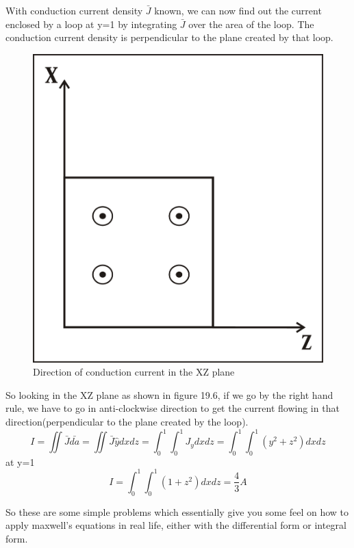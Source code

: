 \begin{example}
With conduction current density $\bar{J}$ known, we can now find out the current enclosed by a loop at y=1 by integrating $\bar{J}$ over the area of the loop. The conduction current density is perpendicular to the plane created by that loop.
\begin{figure}[h]
\centering
\includegraphics[width=.4\linewidth]{./graphics/problem3}
\caption{Direction of conduction current in the XZ plane}
\end{figure} 
So looking in the XZ plane as shown in figure 19.6, if we go by the right hand rule, we have to go in anti-clockwise direction to get the current flowing in that direction(perpendicular to the plane created by the loop).
\begin{dmath*}
I=\iint\bar{J}\bar{da}=\iint\bar{J}\hat{y}dxdz
=\int_{0}^{1}\int_{0}^{1}J_{y}dxdz
=\int_{0}^{1}\int_{0}^{1}(y^{2}+z^{2})dxdz
\end{dmath*}
at y=1
\begin{dmath*}
I=\int_{0}^{1}\int_{0}^{1}(1+z^{2})dxdz
= \frac{4}{3}A
\end{dmath*}
\end{example}
So these are some simple problems which essentially give you some feel on how to apply maxwell's equations in real life, either with the differential form or integral form.